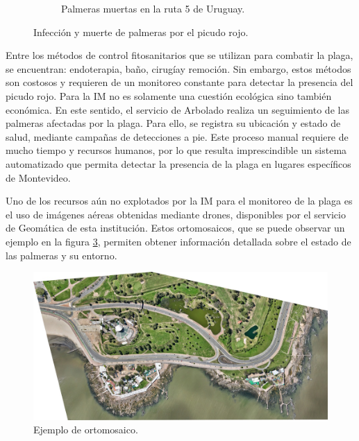 \begin{figure}[htpb]
\begin{subfigure}[b]{0.49\textwidth}
    \caption{Palmeras muertas en la ruta 5 de Uruguay.}
    \label{fig:palmeras-ruta5}
  \end{subfigure}
  \caption{Infección y muerte de palmeras por el picudo rojo.}
  \label{fig:infeccion-y-muerte-palmeras}
\end{figure}

Entre los métodos de control fitosanitarios que se utilizan para combatir la plaga, se encuentran: endoterapia\footnotemark, baño, cirugía\footnotemark y remoción. Sin embargo, estos métodos son costosos y requieren de un monitoreo constante para detectar la presencia del picudo rojo. Para la IM no es solamente una cuestión ecológica sino también económica. En este sentido, el servicio de Arbolado realiza un seguimiento de las palmeras afectadas por la plaga. Para ello, se registra su ubicación y estado de salud, mediante campañas de detecciones a pie. Este proceso manual requiere de mucho tiempo y recursos humanos, por lo que resulta imprescindible un sistema automatizado que permita detectar la presencia de la plaga en lugares específicos de Montevideo.



Uno de los recursos aún no explotados por la IM para el monitoreo de la plaga es el uso de imágenes aéreas obtenidas mediante drones, disponibles por el servicio de Geomática de esta institución. Estos ortomosaicos, que se puede observar un ejemplo en la figura \ref{fig:ejemplo-ortomosaico}, permiten obtener información detallada sobre el estado de las palmeras y su entorno.

\begin{figure}[H]
  \centering
  \includegraphics[scale=0.5]{./Figures/ejemplo-ortomosaico.jpg}
  \caption{Ejemplo de ortomosaico\protect\footnotemark.}
  \label{fig:ejemplo-ortomosaico}
\end{figure}


